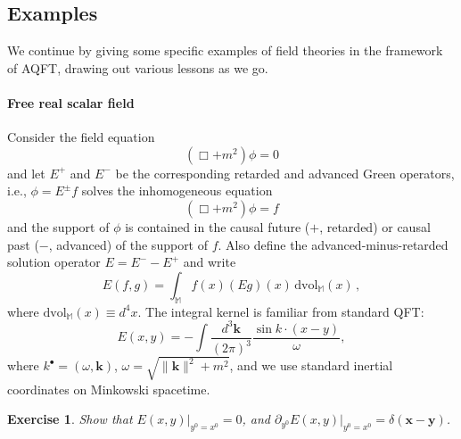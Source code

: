 \documentclass[12pt,a4paper]{article}
\newcommand{\1}{\mathds{1}}                         %
\newcommand{\MM}{\mathbb{M}}
\newcommand{\kb}{{\boldsymbol{k}}}
\newcommand{\xb}{{\boldsymbol{x}}}
\newcommand{\yb}{{\boldsymbol{y}}}
\newcommand{\dvol}{{\textrm{dvol}}}
\newtheorem{exercise}[theorem]{Exercise}
\begin{document}
	\subsection{Examples}\label{sec:examples}
	
	We continue by giving some specific examples of field theories in the framework of AQFT, drawing out various lessons as we go. 
	
	\paragraph{Free real scalar field} Consider the field equation
	\begin{equation}
	(\Box+ m^2)\phi = 0
	\end{equation}
	and let $E^+$ and $E^-$ be the corresponding retarded and advanced Green operators, i.e., 
	$\phi = E^\pm f$ solves the inhomogeneous equation
	\begin{equation}
	(\Box+ m^2)\phi = f
	\end{equation}
	and the support of $\phi$ is contained in the causal future ($+$, retarded) or causal past ($-$, advanced) of the support of $f$. Also define
	the advanced-minus-retarded solution operator $E=E^--E^+$ and write
	\begin{equation}
	E(f,g)= \int_\MM f(x) (Eg)(x)\,\dvol_\MM(x)\,,
	\end{equation}
	where $\dvol_\MM(x)\equiv d^4x$.
	The integral kernel is familiar from standard QFT:
	\begin{equation}
	E(x,y) = -\int \frac{d^3\kb}{(2\pi)^3} \frac{\sin k\cdot (x-y)}{\omega},
	\end{equation}
	where $k^\bullet=(\omega,\kb)$, $\omega=\sqrt{\|\kb\|^2+m^2}$, and we use standard inertial coordinates on Minkowski spacetime.
	\begin{exercise}\label{ex:preETCR}
		Show that $E(x,y)|_{y^0=x^0}=0$, and $\partial_{y^0}E(x,y)|_{y^0=x^0}=\delta(\xb-\yb)$.
	\end{exercise}
	
\end{document}
